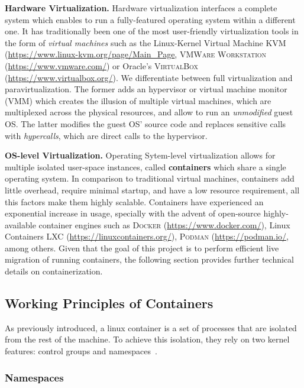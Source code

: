 \textbf{Hardware Virtualization.}
Hardware virtualization interfaces a complete system which enables to run a fully-featured operating system within a different one.
It has traditionally been one of the most user-friendly virtualization tools in the form of \emph{virtual machines} such as the Linux-Kernel Virtual Machine \textsc{KVM} (\url{https://www.linux-kvm.org/page/Main_Page}, \textsc{VMWare Workstation} (\url{https://www.vmware.com/}) or Oracle's \textsc{VirtualBox} (\url{https://www.virtualbox.org/}).
We differentiate between full virtualization and paravirtualization.
The former adds an hypervisor or virtual machine monitor (VMM) which creates the illusion of multiple virtual machines, which are multiplexed across the physical resources, and allow to run an \emph{unmodified} guest OS.
The latter modifies the guest OS' source code and replaces sensitive calls with \emph{hypercalls}, which are direct calls to the hypervisor.

\textbf{OS-level Virtualization.}
Operating Sytem-level virtualization allows for multiple isolated user-space instances, called \textbf{containers} which share a single operating system.
In comparison to traditional virtual machines, containers add little overhead, require minimal startup, and have a low resource requirement, all this factors make them highly scalable.
Containers have experienced an exponential increase in usage, specially with the advent of open-source highly-available container engines such as \textsc{Docker} (\url{https://www.docker.com/}), Linux Containers \textsc{LXC} (\url{https://linuxcontainers.org/}), \textsc{Podman} (\url{https://podman.io/}, among others.
Given that the goal of this project is to perform efficient live migration of running containers, the following section provides further technical details on containerization.

\subsection{Working Principles of Containers}

As previously introduced, a linux container is a set of processes that are isolated from the rest of the machine.
To achieve this isolation, they rely on two kernel features: control groups and namespaces~\cite{namespaces-manual}.

\subsubsection*{Namespaces}

